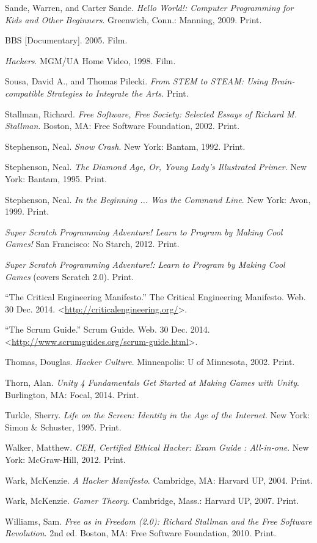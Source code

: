 \documentclass[letterpaper,10pt,english]{sphinxmanual}
\begin{document}
Sande, Warren, and Carter Sande. \emph{Hello World!: Computer Programming for Kids and Other Beginners}. Greenwich, Conn.: Manning, 2009. Print.

BBS {[}Documentary{]}. 2005. Film.

\emph{Hackers}. MGM/UA Home Video, 1998. Film.

Sousa, David A., and Thomas Pilecki. \emph{From STEM to STEAM: Using
Brain-compatible Strategies to Integrate the Arts.} Print.

Stallman, Richard. \emph{Free Software, Free Society: Selected Essays of Richard M. Stallman}. Boston, MA: Free Software Foundation, 2002. Print.

Stephenson, Neal. \emph{Snow Crash}. New York: Bantam, 1992. Print.

Stephenson, Neal. \emph{The Diamond Age, Or, Young Lady's Illustrated Primer}.
New York: Bantam, 1995. Print.

Stephenson, Neal. \emph{In the Beginning ... Was the Command Line}. New York:
Avon, 1999. Print.

\emph{Super Scratch Programming Adventure! Learn to Program by Making Cool Games!} San Francisco: No Starch, 2012. Print.

\emph{Super Scratch Programming Adventure!: Learn to Program by Making Cool Games} (covers Scratch 2.0). Print.

``The Critical Engineering Manifesto.'' The Critical Engineering Manifesto. Web. 30 Dec. 2014. \textless{}\href{http://criticalengineering.org/}{http://criticalengineering.org/}\textgreater{}.

``The Scrum Guide.'' Scrum Guide. Web. 30 Dec. 2014. \textless{}\href{http://www.scrumguides.org/scrum-guide.html}{http://www.scrumguides.org/scrum-guide.html}\textgreater{}.

Thomas, Douglas. \emph{Hacker Culture}. Minneapolis: U of Minnesota, 2002.
Print.

Thorn, Alan. \emph{Unity 4 Fundamentals Get Started at Making Games with Unity}. Burlington, MA: Focal, 2014. Print.

Turkle, Sherry. \emph{Life on the Screen: Identity in the Age of the Internet}. New York: Simon \& Schuster, 1995. Print.

Walker, Matthew. \emph{CEH, Certified Ethical Hacker: Exam Guide : All-in-one}. New York: McGraw-Hill, 2012. Print.

Wark, McKenzie. \emph{A Hacker Manifesto}. Cambridge, MA: Harvard UP, 2004. Print.

Wark, McKenzie. \emph{Gamer Theory}. Cambridge, Mass.: Harvard UP, 2007. Print.

Williams, Sam. \emph{Free as in Freedom (2.0): Richard Stallman and the Free Software Revolution}. 2nd ed. Boston, MA: Free Software Foundation, 2010. Print.



\renewcommand{\indexname}{Index}
\printindex
\end{document}
